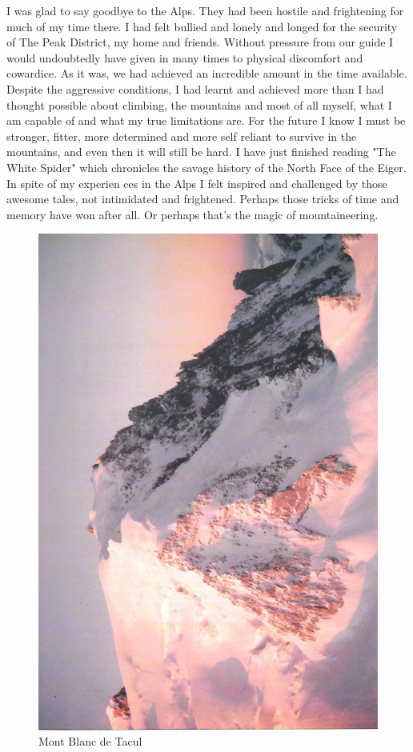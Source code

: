 \documentclass[a5paper,openany,font 10pt]{scrbook}
\begin{document}
I was glad to say goodbye to the Alps. They had been hostile
and frightening for much of my time there. I had felt bullied and
lonely and longed for the security of The Peak District, my home
and friends. Without pressure from our guide I would undoubtedly
have given in many times to physical discomfort and cowardice. As
it was, we had achieved an incredible amount in the time
available. Despite the aggressive conditions, I had learnt and
achieved more than I had thought possible   about climbing, the
mountains and most of all myself, what I am capable of and what
my true limitations are. For the future I know I must be
stronger, fitter, more determined and more self reliant to
survive in the mountains, and even then it will still be hard. I
have just finished reading "The White Spider" which chronicles
the savage history of the North Face of the Eiger. In spite of my
experien ces in the Alps I felt inspired and challenged by those
awesome tales, not intimidated and frightened. Perhaps those
tricks of time and memory have won after all. Or perhaps that's
the magic of mountaineering.
\begin{figure}[htb]
\centering
\includegraphics[width=.9\linewidth]{./images/Mon_Blanc_de_Tacul.jpg}
\caption{\label{fig:orgb6e0ac9}
Mont Blanc de Tacul}
\end{figure}
\end{document}
